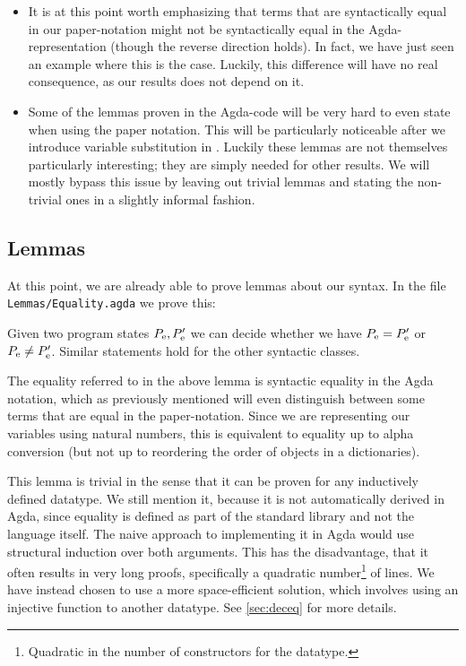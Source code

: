 \begin{itemize}
\item It is at this point worth emphasizing that terms that are syntactically
  equal in our paper-notation might not be syntactically equal in the
  Agda-representation (though the reverse direction holds). In fact, we have
  just seen an example where this is the case. Luckily, this difference will
  have no real consequence, as our results does not depend on it.
\item Some of the lemmas proven in the Agda-code will be very hard to even state
  when using the paper notation. This will be particularly noticeable after we
  introduce variable substitution in \ATAL. Luckily these lemmas are not
  themselves particularly interesting; they are simply needed for other
  results. We will mostly bypass this issue by leaving out trivial lemmas and
  stating the non-trivial ones in a slightly informal fashion.
\end{itemize}

\subsection{Lemmas}
\label{sec:equality}

At this point, we are already able to prove lemmas about our syntax. In the file
\texttt{Lemmas/Equality.agda} we prove this:

\begin{lemma}
  Given two program states $P_{\mathrm{e}}, P'_{\mathrm{e}}$ we can decide whether we
  have $P_{\mathrm{e}} = P'_{\mathrm{e}}$ or $P_{\mathrm{e}} \neq P'_{\mathrm{e}}$. Similar
  statements hold for the other syntactic classes.
\end{lemma}

The equality referred to in the above lemma is syntactic equality in the Agda
notation, which as previously mentioned will even distinguish between some terms
that are equal in the paper-notation. Since we are representing our variables
using natural numbers, this is equivalent to equality up to alpha conversion
(but not up to reordering the order of objects in a dictionaries).

This lemma is trivial in the sense that it can be proven for any inductively
defined datatype. We still mention it, because it is not automatically derived
in Agda, since equality is defined as part of the standard library and not the
language itself. The naive approach to implementing it in Agda would use
structural induction over both arguments. This has the disadvantage, that it
often results in very long proofs, specifically a quadratic
number\footnote{Quadratic in the number of constructors for the datatype.} of
lines. We have instead chosen to use a more space-efficient solution, which
involves using an injective function to another datatype. See \cref{sec:deceq}
for more details.

